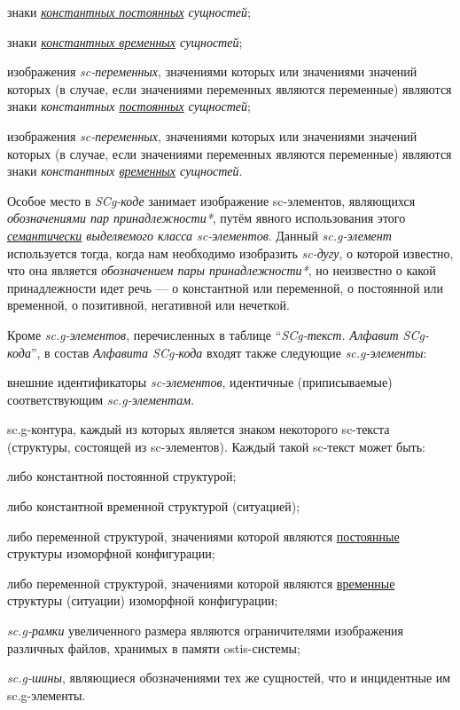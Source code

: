 \begin{textitemize}
	\item знаки \textit{\uline{константных постоянных} сущностей};
	\item знаки \textit{\uline{константных временных} сущностей};
	\item изображения \textit{sc-переменных}, значениями которых или значениями значений которых (в случае, если значениями переменных являются переменные) являются знаки \textit{константных \uline{постоянных} сущностей};
	\item изображения \textit{sc-переменных}, значениями которых или значениями значений которых (в случае, если значениями переменных являются переменные) являются знаки \textit{константных \uline{временных} сущностей}.
\end{textitemize}

Особое место в \textit{SCg-коде} занимает изображение sc-элементов, являющихся \textit{обозначениями пар принадлежности*}, путём явного использования этого \textit {\uline{семантически} выделяемого класса sc-элементов}.
Данный \textit{sc.g-элемент} используется тогда, когда нам необходимо изобразить \textit{sc-дугу}, о которой известно, что она является \textit{обозначением пары принадлежности*}, но неизвестно о какой принадлежности идет речь --- о константной или переменной, о постоянной или временной, о позитивной, негативной или нечеткой.

Кроме \textit{sc.g-элементов}, перечисленных в таблице ``\textit{SCg-текст. Алфавит SCg-кода\scnsupergroupsign}'', в состав \textit{Алфавита SCg-кода\scnsupergroupsign} входят также следующие \textit{sc.g-элементы}:
\begin{textitemize}
	\item внешние идентификаторы \textit{sc-элементов}, идентичные (приписываемые) соответствующим \textit{sc.g-элементам}.
	\item sc.g-контура, каждый из которых является знаком некоторого sc-текста (структуры, состоящей из sc-элементов). Каждый такой sc-текст может быть:
	\begin{textitemize}
		\item либо константной постоянной структурой;
		\item либо константной временной структурой (ситуацией);
		\item либо переменной структурой, значениями которой являются \uline{постоянные} структуры изоморфной  конфигурации;
		\item либо переменной структурой, значениями которой являются \uline{временные} структуры (ситуации) изоморфной  конфигурации;
	\end{textitemize}
	\item \textit{sc.g-рамки} увеличенного размера являются ограничителями изображения различных файлов, хранимых в памяти ostis-системы;
	\item \textit{sc.g-шины}, являющиеся обозначениями тех же сущностей, что и инцидентные им sc.g-элементы.
\end{textitemize}

